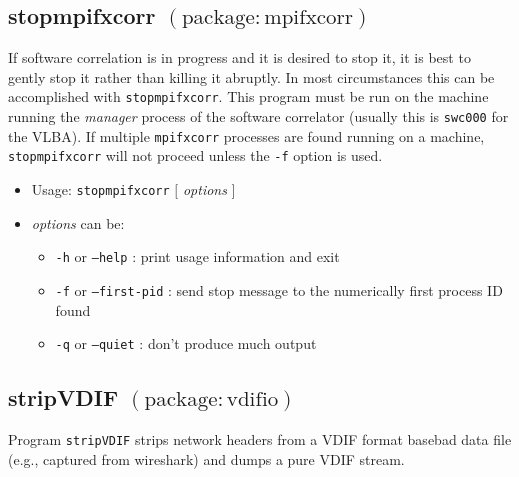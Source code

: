 
\subsection{stopmpifxcorr {\small $\mathrm{(package: mpifxcorr)}$}} \label{sec:stopmpifxcorr}

If software correlation is in progress and it is desired to stop it, it is best to gently stop it rather than killing it abruptly.
In most circumstances this can be accomplished with {\tt stopmpifxcorr}.
This program must be run on the machine running the {\em manager} process of the software correlator (usually this is {\tt swc000} for the VLBA).
If multiple {\tt mpifxcorr} processes are found running on a machine, {\tt stopmpifxcorr} will not proceed unless the
{\tt -f} option is used.

\begin{itemize}
\item[] Usage: {\tt stopmpifxcorr} $[$ {\em options} $]$
\item[] {\em options} can be:
\begin{itemize}
\item[] {\tt -h} or {\tt --help} : print usage information and exit
\item[] {\tt -f} or {\tt --first-pid} : send stop message to the numerically first process ID found
\item[] {\tt -q} or {\tt --quiet} : don't produce much output
\end{itemize}
\end{itemize}










\subsection{stripVDIF {\small $\mathrm{(package: vdifio)}$} \label{sec:stripVDIF}}

Program {\tt stripVDIF} strips network headers from a VDIF format basebad data file (e.g., captured from wireshark) and dumps a pure VDIF stream.

